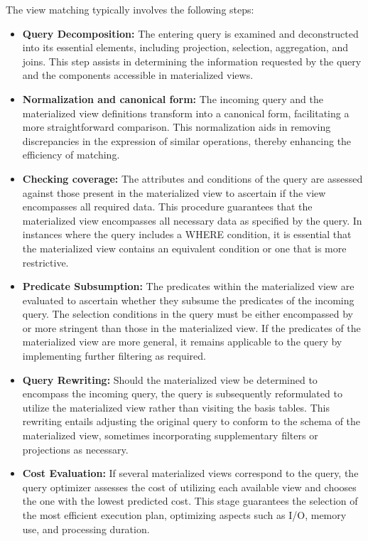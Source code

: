  The view matching typically involves the following steps:
  \begin{itemize}
      \item \textbf{Query Decomposition:} The entering query is examined and deconstructed into its essential elements, including projection, selection, aggregation, and joins.
This step assists in determining the information requested by the query and the components accessible in materialized views.

      \item \textbf{Normalization and canonical form:} The incoming query and the materialized view definitions transform into a canonical form, facilitating a more straightforward comparison.
This normalization aids in removing discrepancies in the expression of similar operations, thereby enhancing the efficiency of matching.

     \item \textbf{Checking coverage:} The attributes and conditions of the query are assessed against those present in the materialized view to ascertain if the view encompasses all required data. This procedure guarantees that the materialized view encompasses all necessary data as specified by the query. In instances where the query includes a WHERE condition, it is essential that the materialized view contains an equivalent condition or one that is more restrictive.
     
      \item \textbf{Predicate Subsumption:} The predicates within the materialized view are evaluated to ascertain whether they subsume the predicates of the incoming query.
The selection conditions in the query must be either encompassed by or more stringent than those in the materialized view. If the predicates of the materialized view are more general, it remains applicable to the query by implementing further filtering as required.

      \item \textbf{Query Rewriting:} Should the materialized view be determined to encompass the incoming query, the query is subsequently reformulated to utilize the materialized view rather than visiting the basis tables.
This rewriting entails adjusting the original query to conform to the schema of the materialized view, sometimes incorporating supplementary filters or projections as necessary.

         \item \textbf{Cost Evaluation:} If several materialized views correspond to the query, the query optimizer assesses the cost of utilizing each available view and chooses the one with the lowest predicted cost.
This stage guarantees the selection of the most efficient execution plan, optimizing aspects such as I/O, memory use, and processing duration.

  \end{itemize}


